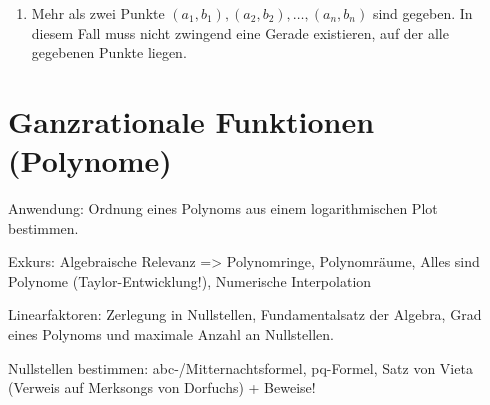 \begin{problem}
\begin{enumerate}
        \item Mehr als zwei Punkte \((a_1, b_1), (a_2, b_2), \dots, (a_n, b_n)\) sind gegeben. In diesem Fall muss nicht zwingend eine Gerade existieren, auf der alle gegebenen Punkte liegen. \par
        \begin{normalfont}
            
        \end{normalfont}
    \end{enumerate}
\end{problem}

\section{Ganzrationale Funktionen (Polynome)}

Anwendung: Ordnung eines Polynoms aus einem logarithmischen Plot bestimmen. 

Exkurs: Algebraische Relevanz => Polynomringe, Polynomräume, Alles sind Polynome (Taylor-Entwicklung!), Numerische Interpolation

\begin{definition}
    
\end{definition}

Linearfaktoren: Zerlegung in Nullstellen, Fundamentalsatz der Algebra, Grad eines Polynoms und maximale Anzahl an Nullstellen.

\begin{theorem}[Linearfaktorzerlegung]
    
\end{theorem}

\begin{theorem}
    
\end{theorem}

\begin{theorem}
    
\end{theorem}

Nullstellen bestimmen: abc-/Mitternachtsformel, pq-Formel, Satz von Vieta (Verweis auf Merksongs von Dorfuchs) + Beweise!

\begin{theorem}
    
\end{theorem}


